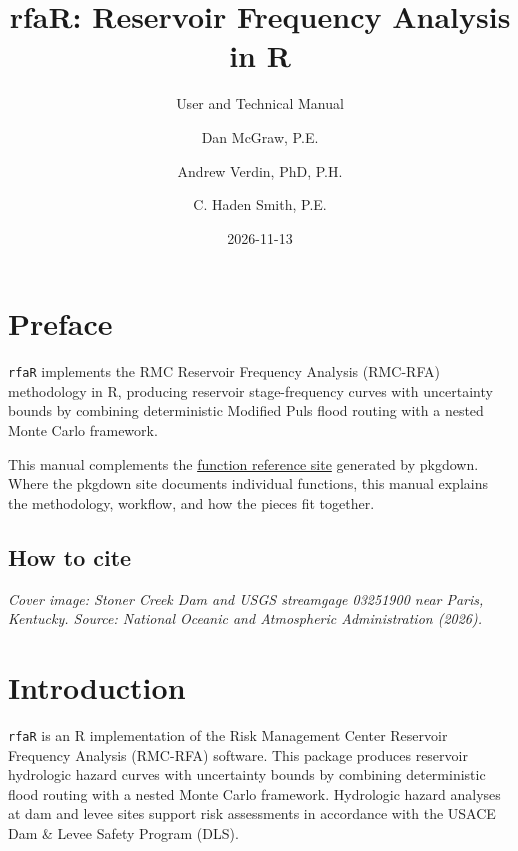 \documentclass[
  letterpaper,
  DIV=11,
  numbers=noendperiod]{scrreprt}
\title{rfaR: Reservoir Frequency Analysis in R}
\subtitle{User and Technical Manual}
\author{Dan McGraw, P.E. \and Andrew Verdin, PhD, P.H. \and C. Haden
Smith, P.E.}
\date{2026-11-13}
\renewcommand*\contentsname{Table of contents}
\newcommand\contentsname{Table of contents}
\begin{document}
\maketitle

\renewcommand*\contentsname{Table of contents}
{
\setcounter{tocdepth}{2}
\tableofcontents
}


\chapter*{Preface}\label{preface}


\texttt{rfaR} implements the RMC Reservoir Frequency Analysis (RMC-RFA)
methodology in R, producing reservoir stage-frequency curves with
uncertainty bounds by combining deterministic Modified Puls flood
routing with a nested Monte Carlo framework.

This manual complements the
\href{https://usace-rmc.github.io/rfaR/}{function reference site}
generated by pkgdown. Where the pkgdown site documents individual
functions, this manual explains the methodology, workflow, and how the
pieces fit together.

\section*{How to cite}\label{how-to-cite}


\emph{Cover image: Stoner Creek Dam and USGS streamgage 03251900 near
Paris, Kentucky. Source: National Oceanic and Atmospheric Administration
(2026).}


\chapter{Introduction}\label{introduction}

\texttt{rfaR} is an R implementation of the Risk Management Center
Reservoir Frequency Analysis (RMC-RFA) software. This package produces
reservoir hydrologic hazard curves with uncertainty bounds by combining
deterministic flood routing with a nested Monte Carlo framework.
Hydrologic hazard analyses at dam and levee sites support risk
assessments in accordance with the USACE Dam \& Levee Safety Program
(DLS).
\end{document}
